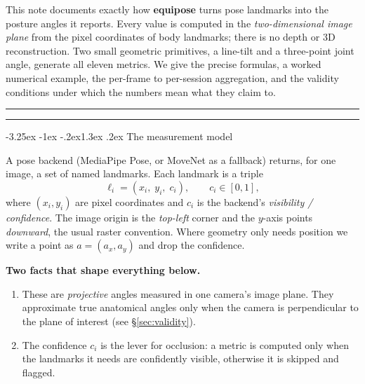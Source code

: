 \documentclass[11pt]{article}
\makeatletter
\renewcommand\section{\@startsection{section}{1}{\z@}%
  {-3.25ex \@plus -1ex \@minus -.2ex}{1.3ex \@plus .2ex}%
  {\normalfont\Large\headingfont\bfseries\color{accent}}}
\newenvironment{kbox}{%
  \par\smallskip\noindent
  \begin{lrbox}{\eqpbox}\begin{minipage}{\dimexpr\linewidth-2.2em\relax}\vspace{0.45em}}%
 {\vspace{0.45em}\end{minipage}\end{lrbox}%
  \noindent\colorbox{accentbg}{\hspace{0.3em}{\color{accent}\vrule width 2.6pt}\hspace{0.8em}\usebox{\eqpbox}\hspace{0.4em}}%
  \par\smallskip}
\makeatother
\begin{document}
\thispagestyle{empty}
\vspace{5pt}
\noindent{\color{accent}\rule{\linewidth}{1.4pt}}
\vspace{4pt}
\vspace{14pt}

\noindent
This note documents exactly how \textbf{equipose} turns pose landmarks into the
posture angles it reports. Every value is computed in the \emph{two-dimensional
image plane} from the pixel coordinates of body landmarks; there is no depth or
3D reconstruction. Two small geometric primitives, a line-tilt and a three-point
joint angle, generate all eleven metrics. We give the precise formulas, a worked
numerical example, the per-frame to per-session aggregation, and the validity
conditions under which the numbers mean what they claim to.

\vspace{6pt}
{\color{rulec}\rule{\linewidth}{0.6pt}}
\setcounter{tocdepth}{2}
\tableofcontents
\vspace{2pt}
{\color{rulec}\rule{\linewidth}{0.6pt}}

\section{The measurement model}

A pose backend (MediaPipe Pose, or MoveNet as a fallback) returns, for one
image, a set of named landmarks. Each landmark is a triple
\[
  \ell_i = (x_i,\; y_i,\; c_i), \qquad c_i \in [0,1],
\]
where $(x_i, y_i)$ are pixel coordinates and $c_i$ is the backend's
\emph{visibility / confidence}. The image origin is the \emph{top-left} corner
and the $y$-axis points \emph{downward}, the usual raster convention. Where
geometry only needs position we write a point as $a = (a_x, a_y)$ and drop the
confidence.

\begin{kbox}
\textbf{Two facts that shape everything below.}
\begin{enumerate}\setlength\itemsep{1pt}
  \item These are \emph{projective} angles measured in one camera's image plane.
        They approximate true anatomical angles only when the camera is
        perpendicular to the plane of interest (see \S\ref{sec:validity}).
  \item The confidence $c_i$ is the lever for occlusion: a metric is computed
        only when the landmarks it needs are confidently visible, otherwise it
        is skipped and flagged.
\end{enumerate}
\end{kbox}
\end{document}
